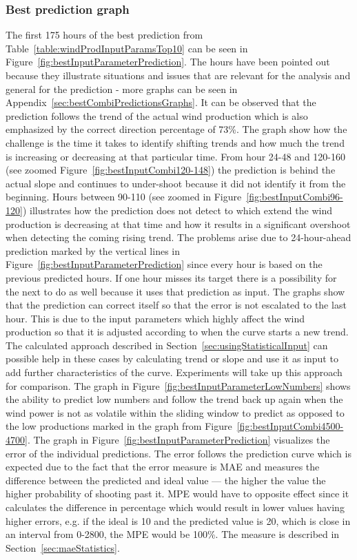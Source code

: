 \subsubsection{Best prediction graph}
\label{sec:bestInputCombiGraph}
The first 175 hours of the best prediction from Table~\ref{table:windProdInputParamsTop10} can be seen in Figure~\ref{fig:bestInputParameterPrediction}. The hours have been pointed out because they illustrate situations and issues that are relevant for the analysis and general for the prediction - more graphs can be seen in Appendix~\ref{sec:bestCombiPredictionsGraphs}. It can be observed that the prediction follows the trend of the actual wind production which is also emphasized by the correct direction percentage of 73\%. The graph show how the challenge is the time it takes to identify shifting trends and how much the trend is increasing or decreasing at that particular time. From hour 24-48 and 120-160 (see zoomed Figure~\ref{fig:bestInputCombi120-148}) the prediction is behind the actual slope and continues to under-shoot because it did not identify it from the beginning. Hours between 90-110 (see zoomed in Figure~\ref{fig:bestInputCombi96-120}) illustrates how the prediction does not detect to which extend the wind production is decreasing at that time and how it results in a significant overshoot when detecting the coming rising trend. The problems arise due to 24-hour-ahead prediction marked by the vertical lines in Figure~\ref{fig:bestInputParameterPrediction} since every hour is based on the previous predicted hours. If one hour misses its target there is a possibility for the next to do as well because it uses that prediction as input. The graphs show that the prediction can correct itself so that the error is not escalated to the last hour. This is due to the input parameters which highly affect the wind production so that it is adjusted according to when the curve starts a new trend. The calculated approach described in Section~\ref{sec:usingStatisticalInput} can possible help in these cases by calculating trend or slope and use it as input to add further characteristics of the curve. Experiments will take up this approach for comparison. The graph in Figure~\ref{fig:bestInputParameterLowNumbers} shows the ability to predict low numbers and follow the trend back up again when the wind power is not as volatile within the sliding window to predict as opposed to the low productions marked in the graph from Figure~\ref{fig:bestInputCombi4500-4700}. The graph in Figure~\ref{fig:bestInputParameterPrediction} visualizes the error of the individual predictions. The error follows the prediction curve which is expected due to the fact that the error measure is MAE and measures the difference between the predicted and ideal value --- the higher the value the higher probability of shooting past it. MPE would have to opposite effect since it calculates the difference in percentage which would result in lower values having higher errors, e.g. if the ideal is 10 and the predicted value is 20, which is close in an interval from 0-2800, the MPE would be 100\%. The measure is described in Section~\ref{sec:maeStatistics}.

